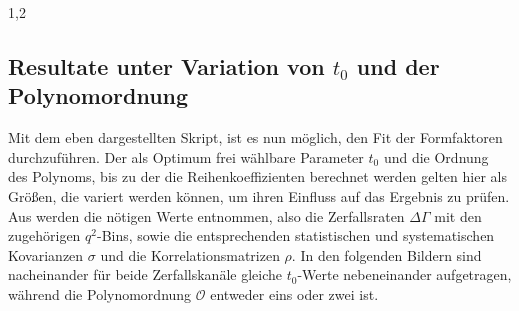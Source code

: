 \documentclass[11pt,a4paper,twoside]{report}
\begin{document}
\begin{spacing}{1,2}
\subsection{Resultate unter Variation von $t_0$ und der Polynomordnung}
\label{sec_results}
Mit dem eben dargestellten Skript, ist es nun möglich, den Fit der Formfaktoren durchzuführen. Der als Optimum frei wählbare Parameter $t_0$ und die 
Ordnung des Polynoms, bis zu der die Reihenkoeffizienten berechnet werden gelten hier als Größen, die variert werden können, um ihren Einfluss auf das
Ergebnis zu prüfen. Aus \cite{PhysRev_Data} werden die nötigen Werte entnommen, also die Zerfallsraten $\Delta \Gamma$ mit den zugehörigen $q^2$-Bins,
sowie die entsprechenden statistischen und systematischen Kovarianzen $\sigma$ und die Korrelationsmatrizen $\rho$. In den folgenden Bildern sind 
nacheinander für beide Zerfallskanäle gleiche $t_0$-Werte nebeneinander aufgetragen, während die Polynomordnung $\mathcal{O}$ entweder eins oder zwei ist.

\end{spacing}
\end{document}
